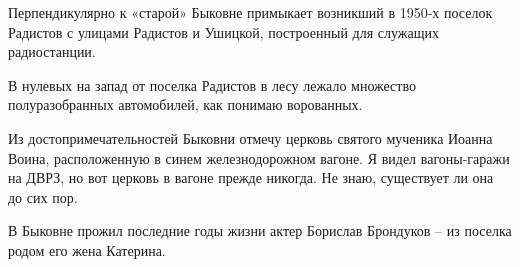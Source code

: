Перпендикулярно к «старой» Быковне примыкает возникший в 1950-х поселок Радистов с улицами Радистов и Ушицкой, построенный для служащих радиостанции. 




В нулевых на запад от поселка Радистов в лесу лежало множество полуразобранных автомобилей, как понимаю ворованных.

Из достопримечательностей Быковни отмечу церковь святого мученика Иоанна Воина, расположенную в синем железнодорожном вагоне. Я видел вагоны-гаражи на ДВРЗ, но вот церковь в вагоне прежде никогда. Не знаю, существует ли она до сих пор.

В Быковне прожил последние годы жизни актер Борислав Брондуков – из поселка родом его жена Катерина.
